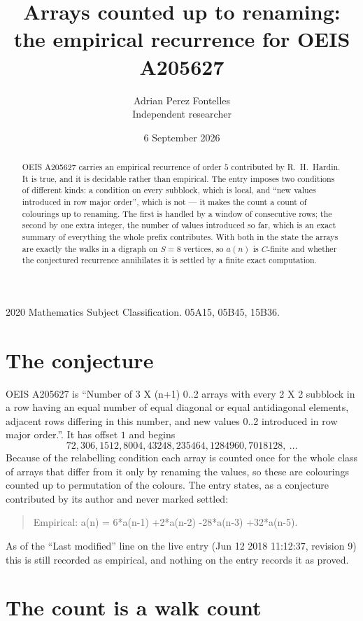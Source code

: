 \documentclass[11pt,a4paper]{article}
\title{Arrays counted up to renaming: the empirical recurrence for OEIS A205627}
\author{Adrian Perez Fontelles\\ \small Independent researcher}
\date{6 September 2026}
\theoremstyle{plain}
\theoremstyle{definition}
\begin{document}
\maketitle

\begin{abstract}
OEIS A205627 carries an empirical recurrence of order $5$ contributed by R.~H.~Hardin. It is
true, and it is decidable rather than empirical. The entry imposes two conditions of different
kinds: a condition on every subblock, which is local, and ``new values introduced in row major
order'', which is not --- it makes the count a count of colourings up to renaming. The first is
handled by a window of consecutive rows; the second by one extra integer, the number of values
introduced so far, which is an exact summary of everything the whole prefix contributes. With
both in the state the arrays are exactly the walks in a digraph on $S=8$ vertices, so $a(n)$
is $C$-finite and whether the conjectured recurrence annihilates it is settled by a finite
exact computation.
\end{abstract}

\noindent\small 2020 Mathematics Subject Classification. 05A15, 05B45, 15B36.\normalsize

\section{The conjecture}

OEIS A205627 is ``Number of 3 X (n+1) 0..2 arrays with every 2 X 2 subblock in a row having an equal number of equal diagonal or equal antidiagonal elements, adjacent rows differing in this number, and new values 0..2 introduced in row major order.''. It has offset $1$ and begins
\[
72, 306, 1512, 8004, 43248, 235464, 1284960, 7018128,\ \dots
\]
Because of the relabelling condition each array is counted once for the whole class of arrays that differ from it only by renaming the values, so these are colourings counted up to permutation of the colours.
The entry states, as a conjecture contributed by its author and never marked settled:
\begin{quote}
Empirical: a(n) = 6*a(n-1) +2*a(n-2) -28*a(n-3) +32*a(n-5).
\end{quote}
As of the ``Last modified'' line on the live entry (Jun 12 2018 11:12:37, revision 9) this is still
recorded as empirical, and nothing on the entry records it as proved.

\section{The count is a walk count}
\end{document}
